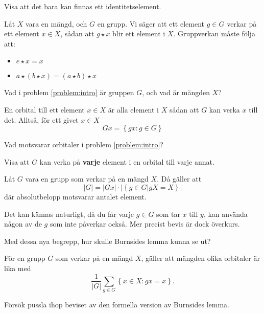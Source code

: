 \begin{problem}
	Visa att det bara kan finnas ett identitetselement.
\end{problem}

\begin{definition}[Gruppverkan]
	Låt \(X\) vara en mängd, och \(G\) en grupp. Vi säger att ett element \(g \in G\) verkar på ett element \(x \in X\), sådan att \(g \star x\) blir ett element i \(X\). Gruppverkan måste följa att:
	\begin{itemize}
		\item \(e \star x = x\) 
		\item \(a \star (b \star x) = (a \star b) \star x\)
	\end{itemize}
\end{definition}

\begin{problem}
	Vad i problem \ref{problem:intro} är gruppen \(G\), och vad är mängden \(X\)?
\end{problem}

\begin{definition}[Orbital]
	En orbital till ett element \(x \in X\) är alla element i \(X\) sådan att \(G\) kan verka \(x\) till det. Alltså, för ett givet \(x \in X\) 
	\[
		Gx = \left\{gx : g \in G\right\}
	\]
\end{definition}

\begin{problem}
	Vad motsvarar orbitaler i problem \ref{problem:intro}?
\end{problem}


\begin{problem}
	Visa att \(G\) kan verka på \textbf{varje} element i en orbital till varje annat.
\end{problem}

\begin{sats}
	Låt \(G\) vara en grupp som verkar på en mängd \(X\). Då gäller att
	\[
		|G| = |Gx|  \cdot |\left\{g \in G | gX = X\right\}|
	\] 
	där absolutbelopp motsvarar antalet element. 
\end{sats}

\begin{obs}
	Det kan kännas naturligt, då du får varje \(g \in G\) som tar \(x\) till \(y\), kan använda någon av de \(g\) som inte påverkar också. Mer precist bevis är dock överkurs.
\end{obs}

\begin{problem}
	Med dessa nya begrepp, hur skulle Burnsides lemma kunna se ut?
\end{problem}

\begin{sats}
	För en grupp \(G\) som verkar på en mängd \(X\), gäller att mängden olika orbitaler är lika med
	\[
		\frac{1}{|G| } \sum_{g \in G} \left\{x \in X: gx = x\right\}.
	\]
\end{sats}

\begin{problem}
	Försök pussla ihop beviset av den formella version av Burnsides lemma.
\end{problem}

